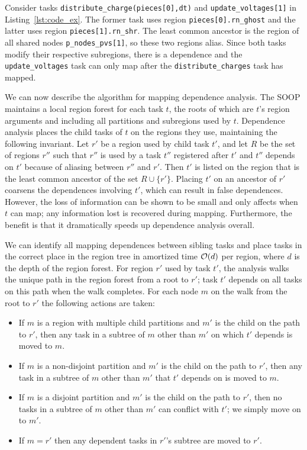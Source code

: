 Consider tasks {\tt distribute\_charge(pieces[0],dt)} and
{\tt update\_voltages[1]} in Listing~\ref{lst:code_ex}.  The former task
uses region {\tt pieces[0].rn\_ghost} and the latter uses region {\tt pieces[1].rn\_shr}.
The least common ancestor is the region of all shared nodes {\tt p\_nodes\_pvs[1]},
so these two regions alias.  Since both tasks modify their respective subregions,
there is a dependence and the {\tt update\_voltages} task can only map after the
{\tt distribute\_charges} task has mapped.

We can now describe the algorithm for mapping dependence analysis.
The SOOP maintains a local region forest for each task $t$,
the roots of which are $t$'s region arguments and including all
partitions and subregions used by $t$.  Dependence analysis
places the child tasks of $t$ on the regions they use, maintaining the
following invariant. Let $r'$ be a region used by child task $t'$,
and let $R$ be the set of regions $r''$ such that $r''$ is used
by a task $t''$ registered after $t'$ and $t''$ depends on $t'$
because of aliasing between $r''$ and $r'$.  Then $t'$ is listed on the
region that is the least common ancestor of the set $R \cup \{r'\}$.
Placing $t'$ on an ancestor of $r'$ coarsens the
dependences involving $t'$, which
can result in false dependences.  However, the loss of
information can be shown to be small and only affects when $t$ can
map; any information lost is recovered during mapping.
Furthermore, the benefit is that it dramatically speeds up
dependence analysis overall.

We can identify all mapping dependences between sibling tasks and place tasks
in the correct place in the region tree in amortized time ${\cal O}(d)$ per region,
where $d$ is the depth of the region forest.  For region $r'$ used by task $t'$, the analysis
walks the unique path in the region forest from a root to $r'$; task $t'$ depends on all tasks
on this path when the walk completes.  For each node $m$
on the walk from the root to $r'$ the following actions are taken:
\begin{itemize}
\item If $m$ is a region with multiple child partitions and $m'$ is the child on the
path to $r'$, then any task in a subtree of $m$ other than $m'$ on which $t'$ depends 
is moved to $m$.

\item If $m$ is a non-disjoint partition and $m'$ is the child on the
path to $r'$, then any task in a subtree of $m$ other than $m'$ that $t'$ depends on is
moved to $m$.

\item If $m$ is a disjoint partition and $m'$ is the child on the
path to $r'$, then no tasks in a subtree of $m$ other than $m'$ can conflict with $t'$; we simply move
on to $m'$.

\item If $m = r'$ then any dependent tasks in $r'$'s subtree are moved to $r'$.
\end{itemize}

